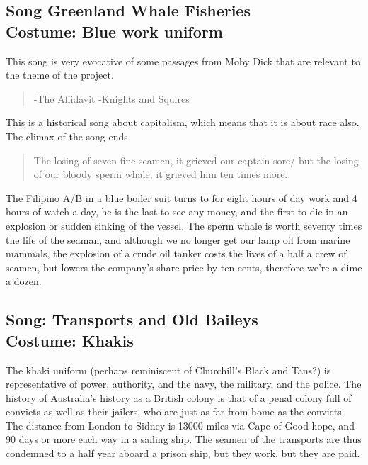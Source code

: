 \documentclass{article}[12pt,letterpaper]
\begin{document}
\subsection{Song Greenland Whale Fisheries\\
Costume: Blue work uniform}
	This song is very evocative of some passages from Moby Dick that are relevant to the theme of the project.
\begin{quote}
     -The Affidavit
 -Knights and Squires
\end{quote}

This is a historical song about capitalism, which means that it is about race also. The climax of the song ends \begin{quote}
    The losing of seven fine seamen, it grieved our captain sore/ but the losing of our bloody sperm whale, it grieved him ten times more.
\end{quote}
The Filipino A/B in a blue boiler suit turns to for eight hours of day work and 4 hours of watch a day, he is the last to see any money, and the first to die in an explosion or sudden sinking of the vessel. The sperm whale is worth seventy times the life of the seaman, and although we no longer get our lamp oil from marine mammals, the explosion of a crude oil tanker costs the lives of a half a crew of seamen, but lowers the company’s share price by ten cents, therefore we’re a dime a dozen.
\subsection{Song: Transports and Old Baileys\\
Costume: Khakis}
The khaki uniform (perhaps reminiscent of Churchill’s Black and Tans?) is representative of power, authority, and the navy, the military, and the police. The history of Australia’s history as a British colony is that of a penal colony full of convicts as well as their jailers, who are just as far from home as the convicts. The distance from London to Sidney is 13000 miles via Cape of Good hope, and 90 days or more each way in a sailing ship. The seamen of the transports are thus condemned to a half year aboard a prison ship, but they work, but they are paid.
\end{document}
